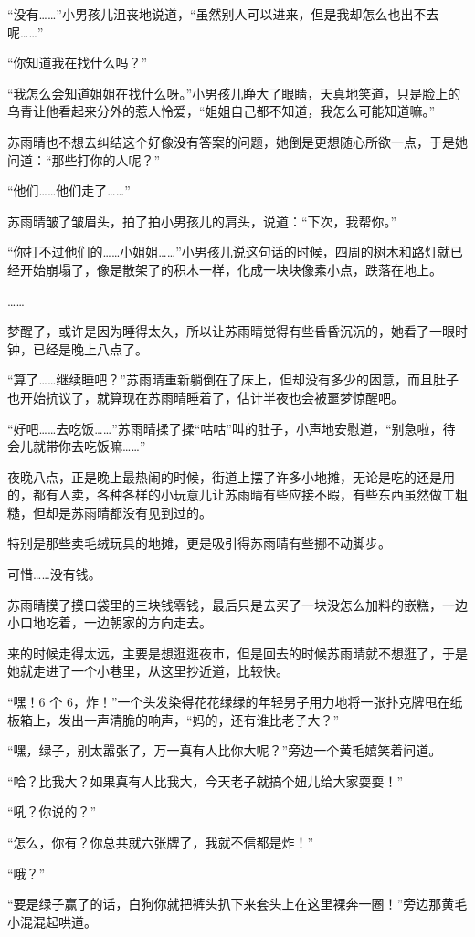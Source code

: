 “没有……”小男孩儿沮丧地说道，“虽然别人可以进来，但是我却怎么也出不去呢……”

“你知道我在找什么吗？”

“我怎么会知道姐姐在找什么呀。”小男孩儿睁大了眼睛，天真地笑道，只是脸上的乌青让他看起来分外的惹人怜爱，“姐姐自己都不知道，我怎么可能知道嘛。”

苏雨晴也不想去纠结这个好像没有答案的问题，她倒是更想随心所欲一点，于是她问道：“那些打你的人呢？”

“他们……他们走了……”

苏雨晴皱了皱眉头，拍了拍小男孩儿的肩头，说道：“下次，我帮你。”

“你打不过他们的……小姐姐……”小男孩儿说这句话的时候，四周的树木和路灯就已经开始崩塌了，像是散架了的积木一样，化成一块块像素小点，跌落在地上。

……

梦醒了，或许是因为睡得太久，所以让苏雨晴觉得有些昏昏沉沉的，她看了一眼时钟，已经是晚上八点了。

“算了……继续睡吧？”苏雨晴重新躺倒在了床上，但却没有多少的困意，而且肚子也开始抗议了，就算现在苏雨晴睡着了，估计半夜也会被噩梦惊醒吧。

“好吧……去吃饭……”苏雨晴揉了揉“咕咕”叫的肚子，小声地安慰道，“别急啦，待会儿就带你去吃饭嘛……”

夜晚八点，正是晚上最热闹的时候，街道上摆了许多小地摊，无论是吃的还是用的，都有人卖，各种各样的小玩意儿让苏雨晴有些应接不暇，有些东西虽然做工粗糙，但却是苏雨晴都没有见到过的。

特别是那些卖毛绒玩具的地摊，更是吸引得苏雨晴有些挪不动脚步。

可惜……没有钱。

苏雨晴摸了摸口袋里的三块钱零钱，最后只是去买了一块没怎么加料的嵌糕，一边小口地吃着，一边朝家的方向走去。

来的时候走得太远，主要是想逛逛夜市，但是回去的时候苏雨晴就不想逛了，于是她就走进了一个小巷里，从这里抄近道，比较快。

“嘿！6 个 6，炸！”一个头发染得花花绿绿的年轻男子用力地将一张扑克牌甩在纸板箱上，发出一声清脆的响声，“妈的，还有谁比老子大？”

“嘿，绿子，别太嚣张了，万一真有人比你大呢？”旁边一个黄毛嬉笑着问道。

“哈？比我大？如果真有人比我大，今天老子就搞个妞儿给大家耍耍！”

“吼？你说的？”

“怎么，你有？你总共就六张牌了，我就不信都是炸！”

“哦？”

“要是绿子赢了的话，白狗你就把裤头扒下来套头上在这里裸奔一圈！”旁边那黄毛小混混起哄道。

